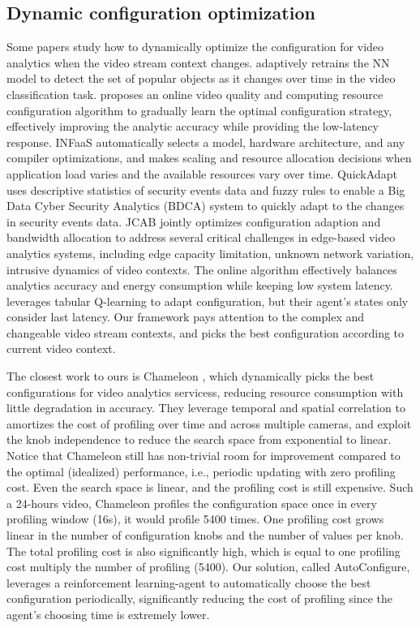 \subsection{Dynamic configuration optimization}
Some papers study how to dynamically optimize the configuration for video analytics when the video stream context changes. \cite{shen2017retrain_model} adaptively retrains the NN model to detect the set of popular objects as it changes over time in the video classification task. \cite{yang2019edge_coordinated} proposes an online video quality and computing resource configuration algorithm to gradually learn the optimal configuration strategy, effectively improving the analytic accuracy while providing the low-latency response. INFaaS \cite{romero2019infaas} automatically selects a model, hardware architecture, and any compiler optimizations, and makes scaling and resource allocation decisions when application load varies and the available resources vary over time. QuickAdapt \cite{ullah2019quickadapt} uses
descriptive statistics of security events data and fuzzy rules to
enable a Big Data Cyber Security Analytics (BDCA) system to quickly adapt to the changes in security events data. JCAB \cite{wang2020jcab} jointly optimizes configuration adaption and bandwidth allocation to address several critical challenges in edge-based video analytics systems, including edge capacity limitation, unknown network variation, intrusive dynamics of video contexts. The online algorithm effectively balances analytics accuracy and energy consumption while keeping low system latency. \cite{argerich2019orchestration} leverages tabular Q-learning to adapt configuration, but their agent's states only consider last latency. Our framework pays attention to the complex and changeable video stream contexts, and picks the best configuration according to current video context. 

The closest work to ours is Chameleon \cite{jiang2018chameleon}, which dynamically picks the best configurations for video analytics servicess, reducing resource consumption with little degradation in accuracy. They leverage temporal and spatial correlation to amortizes the cost of profiling over time and across multiple cameras, and exploit the knob independence to reduce the search space from exponential to linear.\cite{jiang2018chameleon} Notice that Chameleon still has non-trivial room for improvement compared to the optimal (idealized) performance, i.e.,
periodic updating with zero profiling cost. Even the search space is linear, and the profiling cost is still expensive. Such a 24-hours video, Chameleon profiles the configuration space once in every profiling window (16s), it would profile 5400 times. One profiling cost grows linear in the number of configuration knobs and the number of values per knob. The total profiling cost is also significantly high, which is equal to one profiling cost multiply the number of profiling (5400). Our solution, called AutoConfigure, leverages a reinforcement learning-agent to automatically choose the best configuration periodically, significantly reducing the cost of profiling since the agent's choosing time is extremely lower. 

